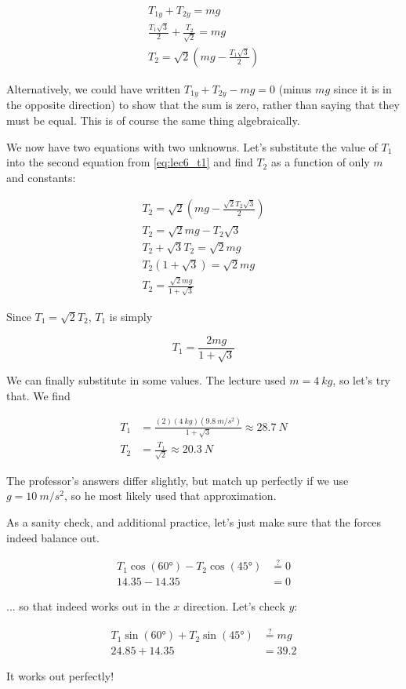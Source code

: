 \documentclass[8.01x]{subfiles}
\begin{document}
\begin{align}
T_{1y} + T_{2y} = m g\\
\frac{T_1 \sqrt{3}}{2} + \frac{T_2}{\sqrt{2}} = m g\\
T_2 = \sqrt{2}\left(m g - \frac{T_1 \sqrt{3}}{2}\right)
\end{align}

Alternatively, we could have written $T_{1y} + T_{2y} - m g = 0$ (minus $m g$ since it is in the opposite direction) to show that the sum is zero, rather than saying that they must be equal. This is of course the same thing algebraically.

We now have two equations with two unknowns. Let's substitute the value of $T_1$ into the second equation from \eqref{eq:lec6_t1} and find $T_2$ as a function of only $m$ and constants:

\begin{align}
T_2 = \sqrt{2}\left(m g - \frac{\sqrt{2} T_2 \sqrt{3}}{2}\right)\\
T_2 = \sqrt{2} m g - T_2 \sqrt{3}\\
T_2 + \sqrt{3} T_2 = \sqrt{2} m g\\
T_2 (1 + \sqrt{3}) = \sqrt{2} m g\\
T_2 = \frac{\sqrt{2} m g}{1 + \sqrt{3}}
\end{align}

Since $T_1 = \sqrt{2} T_2$, $T_1$ is simply

\begin{equation}
T_1 = \frac{2 m g}{1 + \sqrt{3}}
\end{equation}

We can finally substitute in some values. The lecture used $m = \SI{4}{kg}$, so let's try that. We find

\begin{align}
T_1 &= \frac{(2)(\SI{4}{kg})(\SI{9.8}{m/s^2})}{1 + \sqrt{3}} \approx \SI{28.7}{N}\\
T_2 &= \frac{T_1}{\sqrt{2}} \approx \SI{20.3}{N}
\end{align}

The professor's answers differ slightly, but match up perfectly if we use $g = \SI{10}{m/s^2}$, so he most likely used that approximation.

As a sanity check, and additional practice, let's just make sure that the forces indeed balance out.

\begin{align}
T_1 \cos(\ang{60}) - T_2 \cos(\ang{45}) &\overset{?}{=} 0\\
14.35 - 14.35 &= 0
\end{align}

... so that indeed works out in the $x$ direction. Let's check $y$:

\begin{align}
T_1 \sin(\ang{60}) + T_2 \sin(\ang{45}) &\overset{?}{=} m g\\
24.85 + 14.35 &= 39.2
\end{align}

It works out perfectly!
\end{document}
